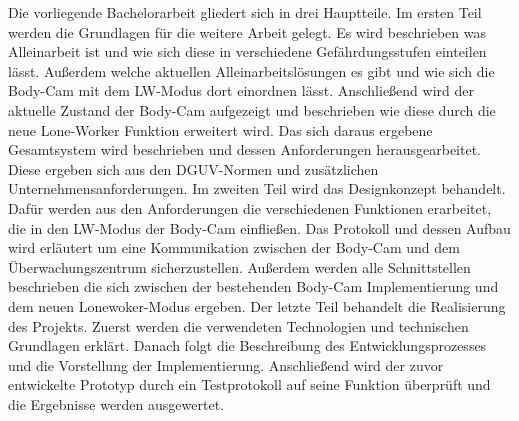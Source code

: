 \documentclass[thesis.tex]{subfiles}
\begin{document}
Die vorliegende Bachelorarbeit gliedert sich in drei Hauptteile.
Im ersten Teil werden die Grundlagen für die weitere Arbeit gelegt.
Es wird beschrieben was Alleinarbeit ist und wie sich diese in verschiedene Gefährdungsstufen einteilen lässt.
Außerdem welche aktuellen Alleinarbeitslösungen es gibt und wie sich die Body-Cam mit dem LW-Modus dort einordnen lässt.
Anschließend wird der aktuelle Zustand der Body-Cam aufgezeigt und beschrieben wie diese durch die neue Lone-Worker Funktion erweitert wird.
Das sich daraus ergebene Gesamtsystem wird beschrieben und dessen Anforderungen herausgearbeitet.
Diese ergeben sich aus den DGUV-Normen und zusätzlichen Unternehmensanforderungen.
Im zweiten Teil wird das Designkonzept behandelt.
Dafür werden aus den Anforderungen die verschiedenen Funktionen erarbeitet, die in den LW-Modus der Body-Cam einfließen.
Das Protokoll und dessen Aufbau wird erläutert um eine Kommunikation zwischen der Body-Cam und dem Überwachungszentrum sicherzustellen.
Außerdem werden alle Schnittstellen beschrieben die sich zwischen der bestehenden Body-Cam Implementierung und dem neuen Lonewoker-Modus ergeben.
Der letzte Teil behandelt die Realisierung des Projekts.
Zuerst werden die verwendeten Technologien und technischen Grundlagen erklärt.
Danach folgt die Beschreibung des Entwicklungsprozesses und die Vorstellung der Implementierung.
Anschließend wird der zuvor entwickelte Prototyp durch ein Testprotokoll auf seine Funktion überprüft und die Ergebnisse werden ausgewertet.



\subfilebib %
\end{document}
